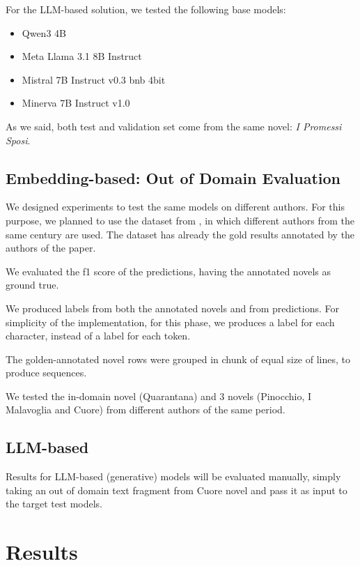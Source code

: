 \documentclass[11pt]{article}
\begin{document}
For the LLM-based solution, we tested the following base models:

 \begin{itemize}
 	\item Qwen3 4B
	\item Meta Llama 3.1 8B Instruct
	\item Mistral 7B Instruct v0.3 bnb 4bit
	\item Minerva 7B Instruct v1.0
\end{itemize}

As we said, both test and validation set come from the same novel: \emph{I Promessi Sposi}. 

\subsection{Embedding-based: Out of Domain Evaluation}

We designed experiments to test the same models on different authors.
For this purpose, we planned to use the dataset from \cite{redaelli-sprugnoli-2024-sentence}, in which different authors
from the same century are used.
The dataset has already the gold results annotated by the authors of the paper.

We evaluated the f1 score of the predictions, having the annotated
novels as ground true.

We produced labels from both the annotated novels and 
from predictions. For simplicity of the implementation,
for this phase, we produces a label for each character, instead of a label for each token.

The golden-annotated novel rows were grouped in chunk of equal size of lines, to produce sequences.

We tested the in-domain novel (Quarantana) and 3 novels (Pinocchio, I Malavoglia and Cuore) from different authors of the same period.

\subsection{LLM-based}

Results for LLM-based (generative)  models will be evaluated manually, simply taking an out of domain 
text fragment from Cuore novel and pass it as input to the target test models.

\section{Results}
\end{document}
